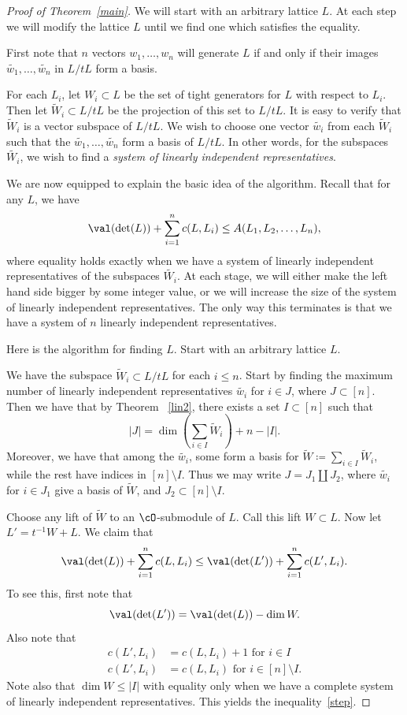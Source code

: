 \begin{proof}[Proof of Theorem~\ref{main}] We will start with an arbitrary lattice $L$. At each step we will modify the lattice $L$ until we find one which satisfies the equality. 

First note that $n$ vectors $w_1, \dots, w_n$ will generate $L$ if and only if their images $\tilde{w_1}, \dots, \tilde{w_n}$ in $L/tL$ form a basis. 

For each $L_i$, let $W_i \subset L$ be the set of tight generators for $L$ with respect to $L_i$. Then let $\tilde{W}_i \subset L/tL$ be the projection of this set to $L/tL$. It is easy to verify that $\tilde{W}_i$ is a vector subspace of $L/tL$. We wish to choose one vector $\tilde{w_i}$ from each $\tilde{W}_i$ such that the $\tilde{w_1}, \dots, \tilde{w_n}$ form a basis of $L/tL$. In other words, for the subspaces $\tilde{W_i}$, we wish to find a \emph{system of linearly independent representatives}.

We are now equipped to explain the basic idea of the algorithm. Recall that for any $L$, we have
\[
\val(\det(L)) + \sum_{i=1}^n c(L,L_i) \leq A(L_1, L_2, \dots, L_n),
\]
where equality holds exactly when we have a system of linearly independent representatives of the subspaces $\tilde{W_i}$. At each stage, we will either make the left hand side bigger by some integer value, or we will increase the size of the system of linearly independent representatives. The only way this terminates is that we have a system of $n$ linearly independent representatives.

Here is the algorithm for finding $L$. Start with an arbitrary lattice $L$.

We have the subspace $\tilde{W}_i \subset L/tL$ for each $i \leq n$. Start by finding the maximum number of linearly independent representatives $\tilde{w_i}$ for $i \in J$, where $J \subset [n]$. Then we have that by Theorem ~\ref{lin2}, there exists a set $I \subset [n]$ such that 
\[
|J| = \dim \left( \sum_{i\in I} \tilde{W}_i \right) + n - |I|.
\]
Moreover, we have that among the $\tilde{w_i}$, some form a basis for $\tilde{W} \coloneqq  \sum_{i \in I} \tilde{W}_i$, while the rest have indices in $[n] \setminus I$. Thus we may write $J = J_1 \coprod J_2$, where $\tilde{w_i}$ for $i \in J_1$ give a basis of $\tilde{W}$, and $J_2 \subset [n] \setminus I.$

Choose any lift of $\tilde{W}$ to an $\cO$-submodule of $L$. Call this lift $W \subset L$. Now let $L' = t^{-1}W + L$. We claim that
\begin{equation} \label{step}
\val(\det(L)) + \sum_{i=1}^n c(L,L_i) \leq \val(\det(L')) + \sum_{i=1}^n c(L',L_i) .
\end{equation}
To see this, first note that 
\[
\val(\det(L')) = \val(\det(L)) - \dim W.
\]
Also note that 
\begin{align*}
c(L',L_i) &= c(L,L_i) + 1 \text{ for } i \in I
\\
c(L',L_i) &= c(L,L_i) \text{ for } i \in [n] \setminus I.
\end{align*}
Note also that $\dim W \leq |I|$ with equality only when we have a complete system of linearly independent representatives. This yields the inequality~\eqref{step}.


\end{proof}
